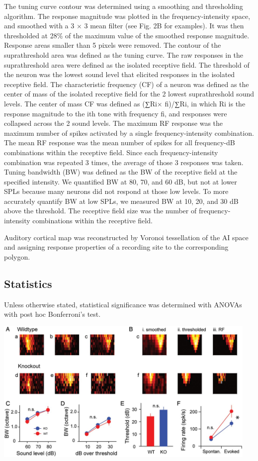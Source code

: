 The tuning curve contour was determined using a smoothing and thresholding algorithm. The response magnitude was plotted in the frequency-intensity space, and smoothed with a 3 $\times$ 3 mean filter (see Fig. 2B for examples). It was then thresholded at 28\% of the maximum value of the smoothed response magnitude. Response areas smaller than 5 pixels were removed. The contour of the suprathreshold area was defined as the tuning curve. The raw responses in the suprathreshold area were defined as the isolated receptive field. The threshold of the neuron was the lowest sound level that elicited responses in the isolated receptive field. The characteristic frequency (CF) of a neuron was defined as the center of mass of the isolated receptive field for the 2 lowest suprathreshold sound levels. The center of mass CF was defined as (∑Ri× fi)/∑Ri, in which Ri is the response magnitude to the ith tone with frequency fi, and responses were collapsed across the 2 sound levels. The maximum RF response was the maximum number of spikes activated by a single frequency-intensity combination. The mean RF response was the mean number of spikes for all frequency-dB combinations within the receptive field. Since each frequency-intensity combination was repeated 3 times, the average of those 3 responses was taken. Tuning bandwidth (BW) was defined as the BW of the receptive field at the specified intensity. We quantified BW at 80, 70, and 60 dB, but not at lower SPLs because many neurons did not respond at those low levels. To more accurately quantify BW at low SPLs, we measured BW at 10, 20, and 30 dB above the threshold. The receptive field size was the number of frequency-intensity combinations within the receptive field.

Auditory cortical map was reconstructed by Voronoi tessellation of the AI space and assigning response properties of a recording site to the corresponding polygon.

\subsection{Statistics}

Unless otherwise stated, statistical significance was determined with ANOVAs with post hoc Bonferroni's test.

\vspace{2\baselineskip}

\centerline{\includegraphics[width=5in]{images/C3F2}}

